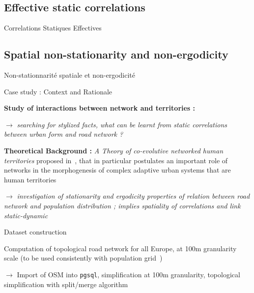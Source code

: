 \subsection{Effective static correlations}{Correlations Statiques Effectives}







\subsection{Spatial non-stationarity and non-ergodicity}{Non-stationnarité spatiale et non-ergodicité}



Case study : Context and Rationale

\textbf{Study of interactions between network and territories :}

\medskip

$\rightarrow$ \textit{searching for stylized facts, what can be learnt from static correlations between urban form and road network ?}

\bigskip

\textbf{Theoretical Background : } \textit{A Theory of co-evolutive networked human territories} proposed in~\cite{raimbault2016memoire}, that in particular postulates an important role of networks in the morphogenesis of complex adaptive urban systems that are human territories

\bigskip

$\rightarrow$ \textit{investigation of stationarity and ergodicity properties of relation between road network and population distribution ; implies spatiality of correlations and link static-dynamic}




Dataset construction

Computation of topological road network for all Europe, at 100m granularity scale (to be used consistently with population grid~\cite{eurostat})

\medskip

$\rightarrow$ Import of OSM into \texttt{pgsql}, simplification at 100m granularity, topological simplification with split/merge algorithm

\bigskip
%
%

